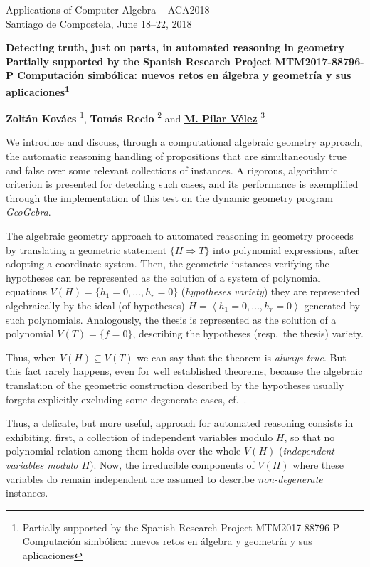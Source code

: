 \documentclass{article}
\makeatletter
\newcommand{\TITLE}[2][]{
  \begin{center} \Large \bfseries #2%
  \def\@temp{#1}\ifx\@temp\@empty\relax\else\footnote{#1}\fi\end{center}}
\newcommand{\AUTHOR}[2][]{\textbf{#2}%
  \def\@temp{#1}\ifx\@temp\@empty\relax\else\textsuperscript{#1}\fi}
\newcommand{\HEADING}{
{\noindent \small Applications of Computer Algebra -- ACA2018 \\
Santiago de Compostela, June 18--22, 2018} \vspace{10pt}}
\makeatother
\begin{document}
\HEADING


\TITLE[Partially supported by the Spanish Research Project MTM2017-88796-P
Computación simbólica: nuevos retos en álgebra y geometría y sus aplicaciones]{Detecting truth,  just on parts, in automated reasoning in geometry}

\begin{center}
 \AUTHOR[1]{Zoltán Kovács},
 \AUTHOR[2]{Tomás Recio} and
 \AUTHOR[3]{\underline{M. Pilar Vélez}}
\end{center}



We introduce and discuss,  through a computational algebraic geometry approach, the automatic reasoning handling of propositions that are simultaneously true and false over some relevant collections of instances.  A rigorous, algorithmic criterion is presented for detecting such cases,  and its performance is exemplified through the implementation of this test on the dynamic geometry program \textit{GeoGebra}.

The algebraic geometry approach to automated reasoning in geometry proceeds by translating a geometric statement $\{H\Rightarrow T\}$ into polynomial expressions, after adopting a coordinate system. Then, the geometric instances verifying the hypotheses  can be represented as the solution of a system of polynomial equations $V(H)=\{h_1=0,\dots,h_r=0\}$ (\emph{hypotheses variety}) they are represented algebraically by the ideal (of hypotheses) $H=\left<h_1=0,\dots,h_r=0\right>$ generated by such polynomials. Analogously, the thesis is represented as the solution of a polynomial
 $V(T)=\{f=0\}$,  describing the hypotheses (resp.~the thesis) variety. 

Thus, when $V(H) \subseteq V(T)$ we can say that the theorem is \emph{always true}. But this fact rarely happens, even for well established theorems, because the algebraic translation of the geometric construction described by the hypotheses usually forgets explicitly excluding some  degenerate cases, cf.~\cite{DR}.

Thus, a delicate, but more useful,  approach for automated reasoning consists in exhibiting, first, a collection of independent variables modulo $H$, so that no polynomial relation among them holds over the whole $V(H)$ (\emph{independent variables modulo $H$}).  Now, the irreducible components of $V(H)$ where these variables do  remain independent are assumed to describe \emph{non-degenerate} instances.
\end{document}
